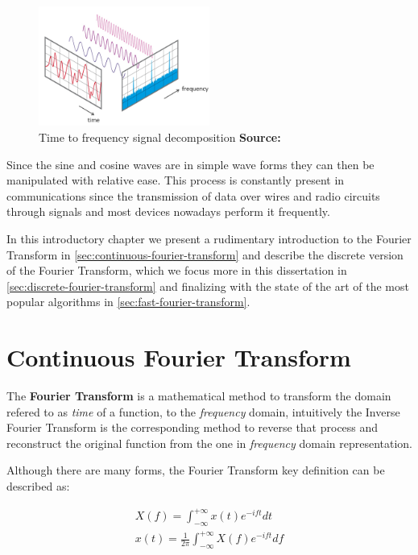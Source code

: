 \documentclass[
  oneside,
  11pt, a4paper,
  footinclude=true,
  headinclude=true,
  cleardoublepage=empty
]{scrbook}
\newcommand{\eqname}[1]{\tag*{#1}}%
\newcommand*{\source}[1]{%
    \textbf{Source:} \cite{#1}%
}
\begin{document}
\begin{figure}[h] 
    \centering
    \includegraphics[width=0.5\textwidth]{img/fft_time_freq.png}
    \caption{Time to frequency signal decomposition \source{fftntiaudio}}
    \label{fig:signal-decomposition}
\end{figure}

Since the sine and cosine waves are in simple wave forms they can then be manipulated with relative ease. This process is constantly present in communications since the transmission of data over wires and radio circuits through signals and most devices nowadays perform it frequently.
\newline

In this introductory chapter we present a rudimentary introduction to the Fourier Transform in \autoref{sec:continuous-fourier-transform} and describe the discrete version of the Fourier Transform, which we focus more in this dissertation in \autoref{sec:discrete-fourier-transform} and finalizing with the state of the art of the most popular algorithms in \autoref{sec:fast-fourier-transform}.

\section{Continuous Fourier Transform} \label{sec:continuous-fourier-transform}

The \textbf{Fourier Transform} is a mathematical method to transform the domain refered to as \textit{time} of a function, to the \textit{frequency} domain, intuitively the Inverse Fourier Transform is the corresponding method to reverse that process and reconstruct the original function from the one in \textit{frequency} domain representation.

Although there are many forms, the Fourier Transform key definition can be described as:

\begin{equation} \label{eq:fourier-transform}
    \begin{split}
        X(f) = \int_{-\infty}^{+\infty} x(t)e^{-i f t} dt \\
        x(t) = \frac{1}{2\pi} \int_{-\infty}^{+\infty} X(f)e^{-i f t} df \\
    \end{split} %
\end{equation}
\end{document}
